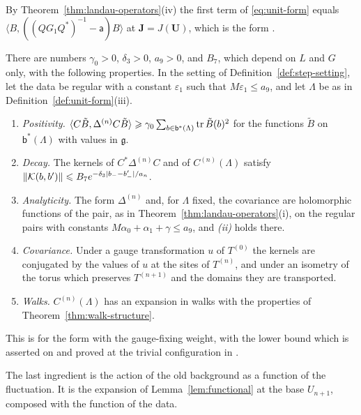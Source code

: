\documentclass[11pt]{preprint}
\DeclarePairedDelimiter{\abs}{\lvert}{\rvert}
\DeclarePairedDelimiter{\norm}{\lVert}{\rVert}
\numberwithin{equation}{section}
\begin{document}
By Theorem~\ref{thm:landau-operators}(iv) the first term of \eqref{eq:unit-form} equals $\langle B, ((QG_1Q^*)^{-1} - \mathsf a)B\rangle$ at $\mathbf J = J(\mathbf U)$, which is the form \cite[(3.156), p.~428]{BalabanPBG}.

\begin{theorem}\label{thm:unit-lattice}
There are numbers $\gamma_0 > 0$, $\delta_3 > 0$, $a_9 > 0$, and $B_7$, which depend on $L$ and $G$ only, with the following properties. In the setting of Definition~\ref{def:step-setting}, let the data be regular with a constant $\varepsilon_1$ such that $M\varepsilon_1 \leqslant a_9$, and let $\Lambda$ be as in Definition~\ref{def:unit-form}(iii).
\begin{enumerate}[label=(\roman*)]
\item \emph{Positivity.} $\langle C\tilde B, \Delta^{(n)}C\tilde B\rangle \geqslant \gamma_0\sum_{b \in \mathsf b^*(\Lambda)}\operatorname{tr}\tilde B(b)^2$ for the functions $\tilde B$ on $\mathsf b^*(\Lambda)$ with values in $\mathfrak g$.
\item \emph{Decay.} The kernels of $C^*\Delta^{(n)}C$ and of $C^{(n)}(\Lambda)$ satisfy $\norm{\mathcal K(b, b')} \leqslant B_7e^{-\delta_3\abs{b_- - b'_-}/a_n}$.
\item \emph{Analyticity.} The form $\Delta^{(n)}$ and, for $\Lambda$ fixed, the covariance are holomorphic functions of the pair, as in Theorem~\ref{thm:landau-operators}(i), on the regular pairs with constants $M\alpha_0 + \alpha_1 + \gamma \leqslant a_9$, and \emph{(ii)} holds there.
\item \emph{Covariance.} Under a gauge transformation $u$ of $T^{(0)}$ the kernels are conjugated by the values of $u$ at the sites of $T^{(n)}$, and under an isometry of the torus which preserves $T^{(n+1)}$ and the domains they are transported.
\item \emph{Walks.} $C^{(n)}(\Lambda)$ has an expansion in walks with the properties of Theorem~\ref{thm:walk-structure}.
\end{enumerate}
\end{theorem}

This is \cite[Theorem~3.15, p.~432]{BalabanPBG} for the form with the gauge-fixing weight, with the lower bound which is asserted on \cite[p.~428]{BalabanPBG} and proved at the trivial configuration in \cite[Lemma~2.4]{BalabanPRT2}.

The last ingredient is the action of the old background as a function of the fluctuation. It is the expansion of Lemma~\ref{lem:functional} at the base $U_{n+1}$, composed with the function of the data.
\end{document}
